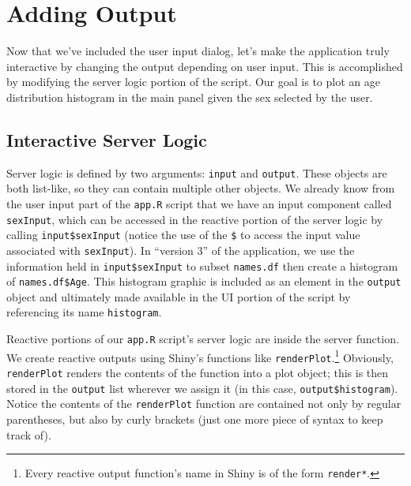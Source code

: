 \documentclass[]{krantz}
\begin{document}
\hypertarget{adding-output}{%
\section{Adding Output}\label{adding-output}}

Now that we've included the user input dialog, let's make the application truly interactive by changing the output depending on user input. This is accomplished by modifying the server logic portion of the script. Our goal is to plot an age distribution histogram in the main panel given the sex selected by the user.

\hypertarget{interactive-server-logic}{%
\subsection{Interactive Server Logic}\label{interactive-server-logic}}

Server logic is defined by two arguments: \texttt{input} and \texttt{output}. These objects are both list-like, so they can contain multiple other objects. We already know from the user input part of the \texttt{app.R} script that we have an input component called \texttt{sexInput}, which can be accessed in the reactive portion of the server logic by calling \texttt{input\$sexInput} (notice the use of the \texttt{\$} to access the input value associated with \texttt{sexInput}). In ``version 3'' of the application, we use the information held in \texttt{input\$sexInput} to subset \texttt{names.df} then create a histogram of \texttt{names.df\$Age}. This histogram graphic is included as an element in the \texttt{output} object and ultimately made available in the UI portion of the script by referencing its name \texttt{histogram}.

Reactive portions of our \texttt{app.R} script's server logic are inside the server function. We create reactive outputs using Shiny's functions like \texttt{renderPlot}.\footnote{Every reactive output function's name in Shiny is of the form \texttt{render*}.} Obviously, \texttt{renderPlot} renders the contents of the function into a plot object; this is then stored in the \texttt{output} list wherever we assign it (in this case, \texttt{output\$histogram}). Notice the contents of the \texttt{renderPlot} function are contained not only by regular parentheses, but also by curly brackets (just one more piece of syntax to keep track of).
\end{document}
